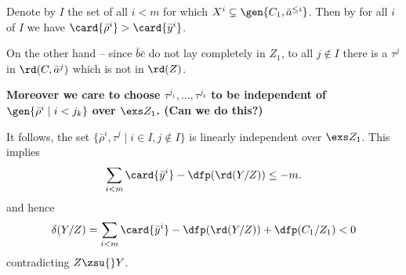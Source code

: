 \documentclass[11pt,german]{article}
\begin{document}
\medskip
Denote by $I$ the set of all $i<m$ for which $X^{i}\subsetneq\gen{C_{1},\bar a^{\leq i}}$. Then by 
for all $i$ of $I$ we have $\card{\bar\rho^{i}}>\card{\bar y^{i}}$.


On the other hand -- since $\bar b\bar c$ do not lay completely in $Z_{1}$, to all $j\notin I$ there is a $\tau^{j}$ in $\rd(C,\bar a^{j})$ which is not in $\rd(Z)$.

{\bf Moreover we care to choose $\tau^{j_{1}},\dots,\tau^{j_{k}}$ to be independent of $\gen{\bar\rho^{i}\mid i<j_{k}}$ over $\exs Z_{1}$.
(Can we do this?)}

It follows, the set $\{\bar\rho^{i},\tau^{j}\mid i\in I, j\notin I\}$ is linearly independent over $\exs Z_{1}$.
This implies
$$\sum_{i<m}\card{\bar y^{i}}-\dfp(\rd(Y/Z))\leq-m.$$
and hence
$$\delta(Y/Z)=\sum_{i<m}\card{\bar y^{i}}-\dfp(\rd(Y/Z))+\dfp(C_{1}/Z_{1})<0$$
contradicting $Z\zsu{}Y$.
\end{document}
